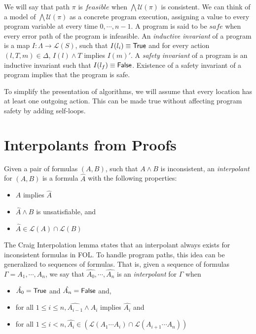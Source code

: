 We will say that path $\pi$ is $feasible$ when $\bigwedge \mathcal{U}(\pi)$ is consistent. We can think of a model of $\bigwedge \mathcal{U}(\pi)$ as a concrete program execution, assigning a value to every program variable at every time $0, \cdots, n-1$. A program is said to be $safe$ when every error path of the program is infeasible. An \textit{inductive invariant} of a program is a map $I : \Lambda \rightarrow \mathcal{L}(S)$, such that $I(l_i) \equiv \mathsf{True}$ and for every action $(l, T, m) \in \Delta$, $I(l) \wedge T$ implies $I(m)'$. A \textit{safety invariant} of a program is an inductive invariant such that $I(l_f) \equiv \mathsf{False}$. Existence of a safety invariant of a program implies that the program is safe.

To simplify the presentation of algorithms, we will assume that every location has at least one outgoing action. This can be made true without affecting program safety by adding self-loops.

\section{Interpolants from Proofs}
\label{sec:interpolants-from-proofs}

Given a pair of formulas $(A,B)$, such that $A \wedge B$ is inconsistent, an \textit{interpolant} for $(A,B)$ is a formula $\hat{A}$ with the following properties:

\begin{itemize}
  \item $A$ implies $\hat{A}$
  \item $\hat{A} \wedge B$ is unsatisfiable, and
  \item $\hat{A} \in \mathcal{L}(A) \cap \mathcal{L}(B)$
\end{itemize}

The Craig Interpolation lemma \cite{craig1957} states that an interpolant always exists for inconsistent formulas in FOL. To handle program paths, this idea can be generalized to sequences of formulas. That is, given a sequence of formulas $\Gamma = A_1, \cdots , A_n$, we say that $\hat{A_0},\cdots, \hat{A_n}$ is an \textit{interpolant} for $\Gamma$ when

\begin{itemize}
  \item $\hat{A_0} = \mathsf{True}$ and $\hat{A_n} = \mathsf{False}$ and,
  \item for all $1 \leq i \leq n, \hat{A_{i-1}} \wedge A_i$ implies $\hat{A_i}$ and
  \item for all $1 \leq i < n, \hat{A_i} \in (\mathcal{L}(A_1 \cdots A_i) \cap \mathcal{L}(A_{i+1}\cdots A_n))$
\end{itemize}

